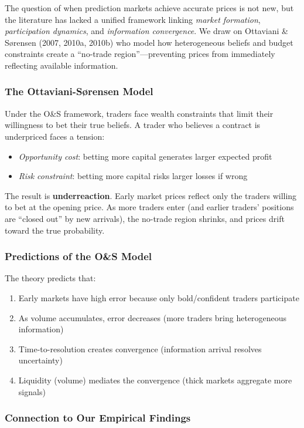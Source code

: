 \documentclass[a4paper,11pt]{article}
\theoremstyle{plain}
\theoremstyle{definition}
\begin{document}
The question of when prediction markets achieve accurate prices is not new, but the literature has lacked a unified framework linking \textit{market formation}, \textit{participation dynamics}, and \textit{information convergence}. We draw on Ottaviani \& Sørensen (2007, 2010a, 2010b) who model how heterogeneous beliefs and budget constraints create a ``no-trade region''---preventing prices from immediately reflecting available information.

\subsubsection{The Ottaviani-Sørensen Model}

Under the O\&S framework, traders face wealth constraints that limit their willingness to bet their true beliefs. A trader who believes a contract is underpriced faces a tension:
\begin{itemize}
\item \textit{Opportunity cost}: betting more capital generates larger expected profit
\item \textit{Risk constraint}: betting more capital risks larger losses if wrong
\end{itemize}

The result is \textbf{underreaction}. Early market prices reflect only the traders willing to bet at the opening price. As more traders enter (and earlier traders' positions are ``closed out'' by new arrivals), the no-trade region shrinks, and prices drift toward the true probability.

\subsubsection{Predictions of the O\&S Model}

The theory predicts that:
\begin{enumerate}
\item Early markets have high error because only bold/confident traders participate
\item As volume accumulates, error decreases (more traders bring heterogeneous information)
\item Time-to-resolution creates convergence (information arrival resolves uncertainty)
\item Liquidity (volume) mediates the convergence (thick markets aggregate more signals)
\end{enumerate}

\subsubsection{Connection to Our Empirical Findings}
\end{document}

